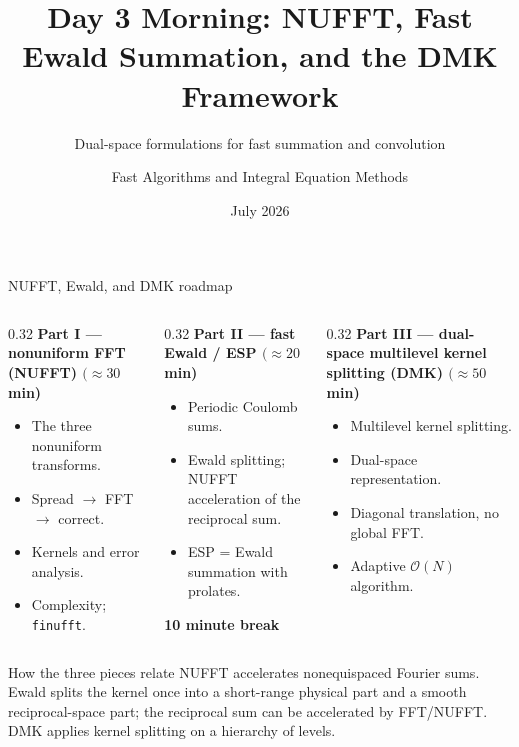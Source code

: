 \documentclass[aspectratio=169,11pt]{beamer}
\title{Day 3 Morning: NUFFT, Fast Ewald Summation, and the DMK Framework}
\subtitle{Dual-space formulations for fast summation and convolution}
\author{Fast Algorithms and Integral Equation Methods}
\institute{AMSS Summer Course \quad (Shidong Jiang)}
\date{July 2026}
\newcommand{\cO}{\mathcal{O}}
\newcommand{\hl}[1]{{\color{CCMorange}\textbf{#1}}}
\begin{document}
\begin{frame}
  \titlepage
\end{frame}

\begin{frame}{NUFFT, Ewald, and DMK roadmap}
\small
\begin{columns}[T,totalwidth=\textwidth]
\begin{column}{0.32\textwidth}
\textbf{Part I --- nonuniform FFT (NUFFT) \((\approx30\) min)}
\begin{itemize}\itemsep2pt
  \item The three nonuniform transforms.
  \item Spread \(\to\) FFT \(\to\) correct.
  \item Kernels and error analysis.
  \item Complexity; \texttt{finufft}.
\end{itemize}
\end{column}
\begin{column}{0.32\textwidth}
\textbf{Part II --- fast Ewald / ESP \((\approx20\) min)}
\begin{itemize}\itemsep2pt
  \item Periodic Coulomb sums.
  \item Ewald splitting; NUFFT acceleration of the reciprocal sum.
  \item ESP = Ewald summation with prolates.
\end{itemize}
\vspace{2mm}
\centerline{\hl{10 minute break}}
\end{column}
\begin{column}{0.32\textwidth}
\textbf{Part III --- dual-space multilevel kernel splitting (DMK) \((\approx50\) min)}
\begin{itemize}\itemsep2pt
  \item Multilevel kernel splitting.
  \item Dual-space representation.
  \item Diagonal translation, no global FFT.
  \item Adaptive \(\cO(N)\) algorithm.
\end{itemize}
\end{column}
\end{columns}

\vspace{3mm}
\begin{block}{How the three pieces relate}
NUFFT accelerates nonequispaced Fourier sums. Ewald splits the kernel once
into a short-range physical part and a smooth reciprocal-space part; the
reciprocal sum can be accelerated by FFT/NUFFT. DMK applies kernel splitting
on a hierarchy of levels.
\end{block}
\end{frame}
\end{document}
